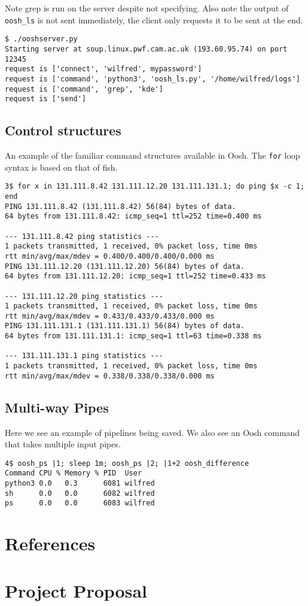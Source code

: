 \documentclass[12pt,twoside,notitlepage]{report}
\begin{document}
Note grep is run on the server despite not specifying. Also note the output of
{\tt oosh\_ls} is not sent immediately, the client only requests it to be sent at
the end.
\begin{verbatim}
$ ./ooshserver.py
Starting server at soup.linux.pwf.cam.ac.uk (193.60.95.74) on port 12345
request is ['connect', 'wilfred', mypassword']
request is ['command', 'python3', 'oosh_ls.py', '/home/wilfred/logs']
request is ['command', 'grep', 'kde']
request is ['send']
\end{verbatim}

\section{Control structures}
\label{forexample}
An example of the familiar command structures available in Oosh. The {\tt for}
loop syntax is based on that of fish.
\begin{verbatim}
3$ for x in 131.111.8.42 131.111.12.20 131.111.131.1; do ping $x -c 1; end
PING 131.111.8.42 (131.111.8.42) 56(84) bytes of data.
64 bytes from 131.111.8.42: icmp_seq=1 ttl=252 time=0.400 ms

--- 131.111.8.42 ping statistics ---
1 packets transmitted, 1 received, 0% packet loss, time 0ms
rtt min/avg/max/mdev = 0.400/0.400/0.400/0.000 ms
PING 131.111.12.20 (131.111.12.20) 56(84) bytes of data.
64 bytes from 131.111.12.20: icmp_seq=1 ttl=252 time=0.433 ms

--- 131.111.12.20 ping statistics ---
1 packets transmitted, 1 received, 0% packet loss, time 0ms
rtt min/avg/max/mdev = 0.433/0.433/0.433/0.000 ms
PING 131.111.131.1 (131.111.131.1) 56(84) bytes of data.
64 bytes from 131.111.131.1: icmp_seq=1 ttl=63 time=0.338 ms

--- 131.111.131.1 ping statistics ---
1 packets transmitted, 1 received, 0% packet loss, time 0ms
rtt min/avg/max/mdev = 0.338/0.338/0.338/0.000 ms
\end{verbatim}

\section{Multi-way Pipes}
Here we see an example of pipelines being saved. We also see an Oosh command
that takes multiple input pipes.
\begin{verbatim}
4$ oosh_ps |1; sleep 1m; oosh_ps |2; |1+2 oosh_difference
Command CPU % Memory % PID  User
python3 0.0   0.3      6081 wilfred
sh      0.0   0.0      6082 wilfred
ps      0.0   0.0      6083 wilfred
\end{verbatim}

\chapter{References}

\chapter{Project Proposal}
\parindent 0pt
\parskip 6pt

\end{document}
